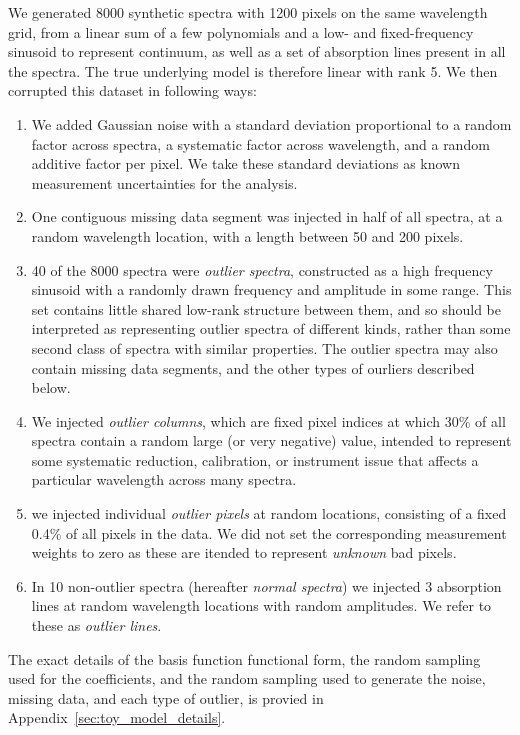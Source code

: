 \documentclass[onecolumn,floatfix]{aastex631}
\begin{document}
We generated 8000 synthetic spectra with 1200 pixels on the same wavelength grid, from a linear sum of a few polynomials and a low- and fixed-frequency sinusoid to represent continuum, as well as a set of absorption lines present in all the spectra.
The true underlying model is therefore linear with rank 5.
We then corrupted this dataset in following ways:
\begin{enumerate}
    \item We added Gaussian noise with a standard deviation proportional to a random factor across spectra, a systematic factor across wavelength, and a random additive factor per pixel. We take these standard deviations as known measurement uncertainties for the analysis.
    \item One contiguous missing data segment was injected in half of all spectra, at a random wavelength location, with a length between 50 and 200 pixels.
    \item 40 of the 8000 spectra were \emph{outlier spectra}, constructed as a high frequency sinusoid with a randomly drawn frequency and amplitude in some range. This set contains little shared low-rank structure between them, and so should be interpreted as representing outlier spectra of different kinds, rather than some second class of spectra with similar properties.
    The outlier spectra may also contain missing data segments, and the other types of ourliers described below.
    \item We injected \emph{outlier columns}, which are fixed pixel indices at which 30\% of all spectra contain a random large (or very negative) value, intended to represent some systematic reduction, calibration, or instrument issue that affects a particular wavelength across many spectra.
    \item we injected individual \emph{outlier pixels} at random locations, consisting of a fixed 0.4\% of all pixels in the data. We did not set the corresponding measurement weights to zero as these are itended to represent \emph{unknown} bad pixels.
    \item In 10 non-outlier spectra (hereafter \emph{normal spectra}) we injected 3 absorption lines at random wavelength locations with random amplitudes. We refer to these as \emph{outlier lines}.
\end{enumerate}
The exact details of the basis function functional form, the random sampling used for the coefficients, and the random sampling used to generate the noise, missing data, and each type of outlier, is provied in Appendix~\ref{sec:toy_model_details}.
\end{document}
